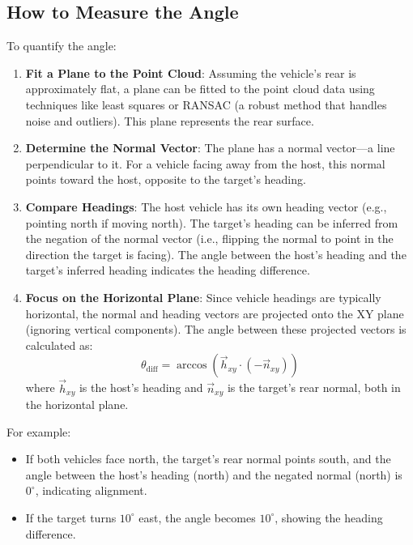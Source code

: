 \documentclass{article}
\begin{document}
\subsection*{How to Measure the Angle}
To quantify the angle:
\begin{enumerate}
    \item \textbf{Fit a Plane to the Point Cloud}: Assuming the vehicle's rear is approximately flat, a plane can be fitted to the point cloud data using techniques like least squares or RANSAC (a robust method that handles noise and outliers). This plane represents the rear surface.
    \item \textbf{Determine the Normal Vector}: The plane has a normal vector---a line perpendicular to it. For a vehicle facing away from the host, this normal points toward the host, opposite to the target's heading.
    \item \textbf{Compare Headings}: The host vehicle has its own heading vector (e.g., pointing north if moving north). The target's heading can be inferred from the negation of the normal vector (i.e., flipping the normal to point in the direction the target is facing). The angle between the host's heading and the target's inferred heading indicates the heading difference.
    \item \textbf{Focus on the Horizontal Plane}: Since vehicle headings are typically horizontal, the normal and heading vectors are projected onto the XY plane (ignoring vertical components). The angle between these projected vectors is calculated as:
    \[
    \theta_{\text{diff}} = \arccos\left(\vec{h}_{xy} \cdot (-\vec{n}_{xy})\right)
    \]
    where \(\vec{h}_{xy}\) is the host's heading and \(\vec{n}_{xy}\) is the target's rear normal, both in the horizontal plane.
\end{enumerate}

For example:
\begin{itemize}
    \item If both vehicles face north, the target's rear normal points south, and the angle between the host's heading (north) and the negated normal (north) is \(0^\circ\), indicating alignment.
    \item If the target turns \(10^\circ\) east, the angle becomes \(10^\circ\), showing the heading difference.
\end{itemize}
\end{document}
